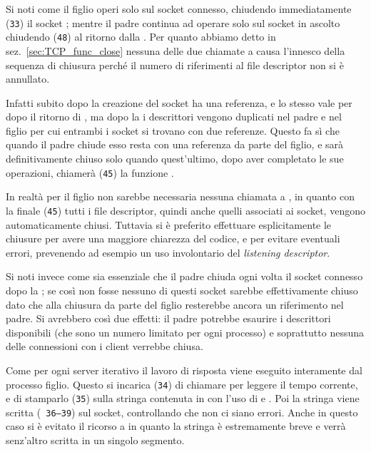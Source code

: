 Si noti come il figlio operi solo sul socket connesso, chiudendo
immediatamente (\texttt{\small 33}) il socket ; mentre il padre
continua ad operare solo sul socket in ascolto chiudendo (\texttt{\small 48})
 al ritorno dalla . Per quanto abbiamo detto in
sez.~\ref{sec:TCP_func_close} nessuna delle due chiamate a  causa
l'innesco della sequenza di chiusura perché il numero di riferimenti al file
descriptor non si è annullato.

Infatti subito dopo la creazione del socket  ha una referenza, e
lo stesso vale per  dopo il ritorno di , ma dopo la
 i descrittori vengono duplicati nel padre e nel figlio per cui
entrambi i socket si trovano con due referenze. Questo fa sì che quando il
padre chiude  esso resta con una referenza da parte del figlio,
e sarà definitivamente chiuso solo quando quest'ultimo, dopo aver completato
le sue operazioni, chiamerà (\texttt{\small 45}) la funzione .

In realtà per il figlio non sarebbe necessaria nessuna chiamata a
, in quanto con la  finale (\texttt{\small 45}) tutti i
file descriptor, quindi anche quelli associati ai socket, vengono
automaticamente chiusi.  Tuttavia si è preferito effettuare esplicitamente le
chiusure per avere una maggiore chiarezza del codice, e per evitare eventuali
errori, prevenendo ad esempio un uso involontario del \textit{listening
  descriptor}.

Si noti invece come sia essenziale che il padre chiuda ogni volta il socket
connesso dopo la ; se così non fosse nessuno di questi socket
sarebbe effettivamente chiuso dato che alla chiusura da parte del figlio
resterebbe ancora un riferimento nel padre. Si avrebbero così due effetti: il
padre potrebbe esaurire i descrittori disponibili (che sono un numero limitato
per ogni processo) e soprattutto nessuna delle connessioni con i client
verrebbe chiusa.

Come per ogni server iterativo il lavoro di risposta viene eseguito
interamente dal processo figlio. Questo si incarica (\texttt{\small 34}) di
chiamare  per leggere il tempo corrente, e di stamparlo
(\texttt{\small 35}) sulla stringa contenuta in  con l'uso di
 e . Poi la stringa viene scritta (\texttt{\small
  36--39}) sul socket, controllando che non ci siano errori. Anche in questo
caso si è evitato il ricorso a  in quanto la stringa è
estremamente breve e verrà senz'altro scritta in un singolo segmento.

